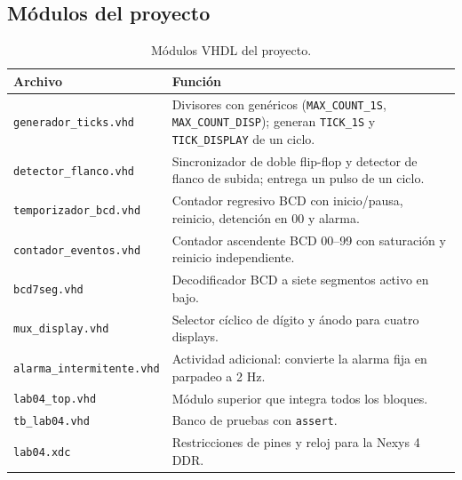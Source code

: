 \documentclass[letterpaper,12pt]{article}
\begin{document}
\subsection{Módulos del proyecto}
\begin{table}[H]
\centering
\caption{Módulos VHDL del proyecto.}
\label{tab:modulos}
\small
\begin{tabularx}{\textwidth}{|l|X|}
\hline
\textbf{Archivo} & \textbf{Función} \\ \hline
\texttt{generador\_ticks.vhd}      & Divisores con genéricos (\texttt{MAX\_COUNT\_1S}, \texttt{MAX\_COUNT\_DISP}); generan \texttt{TICK\_1S} y \texttt{TICK\_DISPLAY} de un ciclo. \\ \hline
\texttt{detector\_flanco.vhd}      & Sincronizador de doble flip-flop y detector de flanco de subida; entrega un pulso de un ciclo. \\ \hline
\texttt{temporizador\_bcd.vhd}     & Contador regresivo BCD con inicio/pausa, reinicio, detención en 00 y alarma. \\ \hline
\texttt{contador\_eventos.vhd}     & Contador ascendente BCD 00--99 con saturación y reinicio independiente. \\ \hline
\texttt{bcd7seg.vhd}               & Decodificador BCD a siete segmentos activo en bajo. \\ \hline
\texttt{mux\_display.vhd}          & Selector cíclico de dígito y ánodo para cuatro displays. \\ \hline
\texttt{alarma\_intermitente.vhd}  & Actividad adicional: convierte la alarma fija en parpadeo a 2 Hz. \\ \hline
\texttt{lab04\_top.vhd}            & Módulo superior que integra todos los bloques. \\ \hline
\texttt{tb\_lab04.vhd}             & Banco de pruebas con \texttt{assert}. \\ \hline
\texttt{lab04.xdc}                 & Restricciones de pines y reloj para la Nexys 4 DDR. \\ \hline
\end{tabularx}
\end{table}

\end{document}
